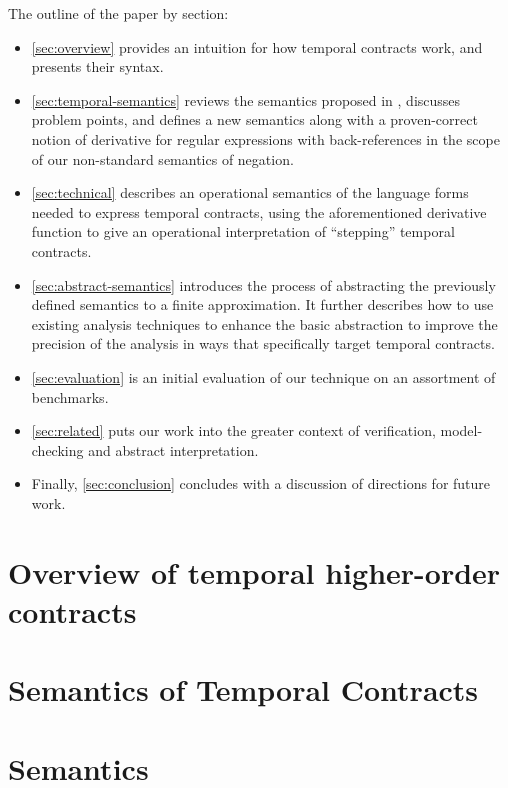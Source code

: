 The outline of the paper by section:

\begin{itemize}
\item{\autoref{sec:overview} provides an intuition for how temporal
  contracts work, and presents their syntax.}
%
\item{\autoref{sec:temporal-semantics} reviews the semantics proposed in
  \dfm, discusses problem points, and defines a new semantics along
  with a proven-correct notion of derivative for regular expressions
  with back-references in the scope of our non-standard semantics of
  negation.}
%
\item{\autoref{sec:technical} describes an operational semantics of the
  language forms needed to express temporal contracts, using the
  aforementioned derivative function to give an operational
  interpretation of ``stepping'' temporal contracts.}
%
\item{\autoref{sec:abstract-semantics} introduces the process of
  abstracting the previously defined semantics to a finite
  approximation.
%
  It further describes how to use existing analysis techniques to enhance the basic abstraction to improve the precision of the analysis in ways that specifically target temporal contracts.}
%
\item{\autoref{sec:evaluation} is an initial evaluation of our technique on an assortment of benchmarks.}
%
\item{\autoref{sec:related} puts our work into the greater context of verification, model-checking and abstract interpretation.}
%
\item{Finally, \autoref{sec:conclusion} concludes with a discussion of directions for future work.}
%
\end{itemize}
\section{Overview of temporal higher-order contracts}\label{sec:overview}


\section{Semantics of Temporal Contracts} \label{sec:temporal-semantics}



\section{Semantics}\label{sec:technical}


